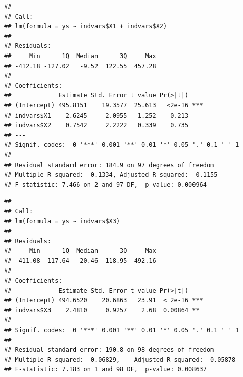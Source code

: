 \documentclass[
]{book}
\newenvironment{Shaded}{\begin{snugshade}}{\end{snugshade}}
\newcommand{\FunctionTok}[1]{\textcolor[rgb]{0.00,0.00,0.00}{#1}}
\newcommand{\NormalTok}[1]{#1}
\newcommand{\OtherTok}[1]{\textcolor[rgb]{0.56,0.35,0.01}{#1}}
\newcommand{\SpecialCharTok}[1]{\textcolor[rgb]{0.00,0.00,0.00}{#1}}
\begin{document}
\begin{verbatim}
## 
## Call:
## lm(formula = ys ~ indvars$X1 + indvars$X2)
## 
## Residuals:
##     Min      1Q  Median      3Q     Max 
## -412.18 -127.02   -9.52  122.55  457.28 
## 
## Coefficients:
##             Estimate Std. Error t value Pr(>|t|)    
## (Intercept) 495.8151    19.3577  25.613   <2e-16 ***
## indvars$X1    2.6245     2.0955   1.252    0.213    
## indvars$X2    0.7542     2.2222   0.339    0.735    
## ---
## Signif. codes:  0 '***' 0.001 '**' 0.01 '*' 0.05 '.' 0.1 ' ' 1
## 
## Residual standard error: 184.9 on 97 degrees of freedom
## Multiple R-squared:  0.1334, Adjusted R-squared:  0.1155 
## F-statistic: 7.466 on 2 and 97 DF,  p-value: 0.000964
\end{verbatim}

\begin{Shaded}
\end{Shaded}

\begin{verbatim}
## 
## Call:
## lm(formula = ys ~ indvars$X3)
## 
## Residuals:
##     Min      1Q  Median      3Q     Max 
## -411.08 -117.64  -20.46  118.95  492.16 
## 
## Coefficients:
##             Estimate Std. Error t value Pr(>|t|)    
## (Intercept) 494.6520    20.6863   23.91  < 2e-16 ***
## indvars$X3    2.4810     0.9257    2.68  0.00864 ** 
## ---
## Signif. codes:  0 '***' 0.001 '**' 0.01 '*' 0.05 '.' 0.1 ' ' 1
## 
## Residual standard error: 190.8 on 98 degrees of freedom
## Multiple R-squared:  0.06829,    Adjusted R-squared:  0.05878 
## F-statistic: 7.183 on 1 and 98 DF,  p-value: 0.008637
\end{verbatim}

\begin{Shaded}
\end{Shaded}
\end{document}
